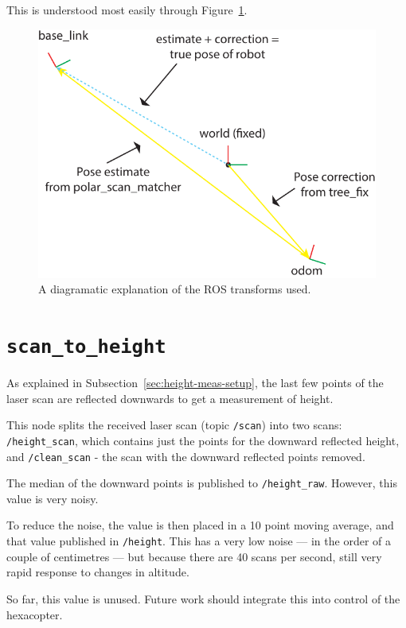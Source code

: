 \documentclass[12pt,oneside,a4paper]{book}
\begin{document}
This is understood most easily through Figure~\ref{fig:rostf}.

\begin{figure}[h!]
  \centering
  \includegraphics[width=\textwidth]{figs/rostf}
  \caption{A diagramatic explanation of the ROS transforms used.}
  \label{fig:rostf}
\end{figure}

\newpage
\section{\texttt{scan\_to\_height}}
\label{sec:scan_to_height}

As explained in Subsection~\ref{sec:height-meas-setup}, the last few
points of the laser scan are reflected downwards to get a measurement
of height.

This node splits the received laser scan (topic \texttt{/scan}) into
two scans: \texttt{/height\_scan}, which contains just the points for
the downward reflected height, and \texttt{/clean\_scan} - the scan
with the downward reflected points removed.

The median of the downward points is published to
\texttt{/height\_raw}. However, this value is very noisy.

To reduce the noise, the value is then placed in a 10 point moving
average, and that value published in \texttt{/height}. This has a very
low noise --- in the order of a couple of centimetres --- but because
there are 40 scans per second, still very rapid response to changes in
altitude.

So far, this value is unused. Future work should integrate this into
control of the hexacopter.
\end{document}
